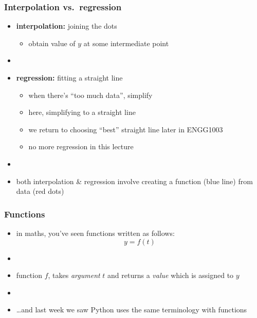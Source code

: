 \documentclass[english,14pt]{beamer}
\newcommand\red[1]{{\color{red} #1}}
\newcommand\blue[1]{{\color{blue} #1}}
\begin{document}

\begin{frame}[fragile]

\frametitle{Interpolation vs.\ regression}

\begin{itemize}
	\item \textbf{interpolation:} joining the dots
	\begin{itemize}
		\item obtain value of $y$ at some intermediate point
	\end{itemize}
	\item[]
	\item \textbf{regression:} fitting a straight line
	\begin{itemize}
		\item when there's ``too much data'', simplify
		\item here, simplifying to a straight line
		\item we return to choosing ``best'' straight line later in ENGG1003
		\item no more regression in this lecture
	\end{itemize}
	\item[]
	\item both interpolation \& regression involve creating a function \blue{(blue line)} from data \red{(red dots)}
\end{itemize}

\end{frame}


\begin{frame}[fragile]

\frametitle{Functions}

\begin{itemize}
	\item in maths, you've seen functions written as follows:
	\[
		y = f(t)
	\]
	\item[]
	\item function $f$, takes \emph{argument} $t$ and returns a \emph{value} which is assigned to $y$
	\item []
	\item \ldots and last week we saw Python uses the same terminology with functions
\end{itemize}

\end{frame}
\end{document}
